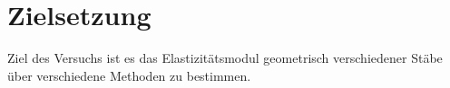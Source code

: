 \section{Zielsetzung}
\label{sec:Zielsetzung}

Ziel des Versuchs ist es das Elastizitätsmodul geometrisch verschiedener Stäbe über verschiedene Methoden zu bestimmen.